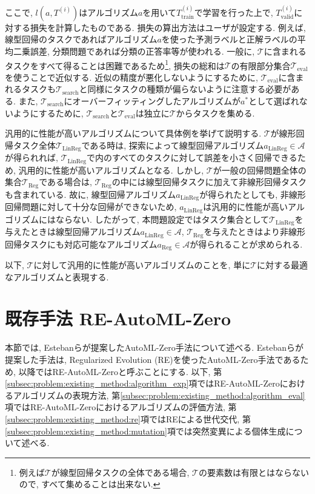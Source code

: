 \documentclass[11pt,oneside,openany,report]{jsbook}
\begin{document}
\noindent
ここで, $l(a, T^{(i)})$はアルゴリズム$a$を用いて$T^{(i)}_\mathrm{train}$で学習を行った上で, $T^{(i)}_\mathrm{valid}$に対する損失を計算したものである. 損失の算出方法はユーザが設定する. 例えば, 線型回帰のタスクであればアルゴリズム$a$を使った予測ラベルと正解ラベルの平均二乗誤差, 分類問題であれば分類の正答率等が使われる. 一般に, $\mathcal{T}$に含まれるタスクをすべて得ることは困難であるため\footnote{例えば$\mathcal{T}$が線型回帰タスクの全体である場合, $\mathcal{T}$の要素数は有限とはならないので, すべて集めることは出来ない. }, 損失の総和は$\mathcal{T}$の有限部分集合$\mathcal{T}_\mathrm{eval}$を使うことで近似する. 近似の精度が悪化しないようにするために, $\mathcal{T}_\mathrm{eval}$に含まれるタスクも$\mathcal{T}_\mathrm{search}$と同様にタスクの種類が偏らないように注意する必要がある. また, $\mathcal{T}_\mathrm{search}$にオーバーフィッティングしたアルゴリズムが$a^\ast$として選ばれないようにするために, $\mathcal{T}_\mathrm{search}$と$\mathcal{T}_\mathrm{eval}$は独立に$\mathcal{T}$からタスクを集める.

汎用的に性能が高いアルゴリズムについて具体例を挙げて説明する. $\mathcal{T}$が線形回帰タスク全体$\mathcal{T}_\mathrm{LinReg}$である時は, 探索によって線型回帰アルゴリズム$a_\mathrm{LinReg} \in \mathcal{A}$が得られれば, $\mathcal{T}_\mathrm{LinReg}$で内のすべてのタスクに対して誤差を小さく回帰できるため, 汎用的に性能が高いアルゴリズムとなる. しかし, $\mathcal{T}$が一般の回帰問題全体の集合$\mathcal{T}_\mathrm{Reg}$である場合は, $\mathcal{T}_\mathrm{Reg}$の中には線型回帰タスクに加えて非線形回帰タスクも含まれている. 故に, 線型回帰アルゴリズム$a_\mathrm{LinReg}$が得られたとしても, 非線形回帰問題に対して十分な回帰ができないため, $a_\mathrm{LinReg}$は汎用的に性能が高いアルゴリズムにはならない. したがって, 本問題設定ではタスク集合として$\mathcal{T}_\mathrm{LinReg}$を与えたときは線型回帰アルゴリズム$a_\mathrm{LinReg}\in \mathcal{A}$, $\mathcal{T}_\mathrm{Reg}$を与えたときはより非線形回帰タスクにも対応可能なアルゴリズム$a_\mathrm{Reg}\in \mathcal{A}$が得られることが求められる.

以下, $\mathcal{T}$に対して汎用的に性能が高いアルゴリズムのことを, 単に$\mathcal{T}$に対する最適なアルゴリズムと表現する.

\section{既存手法 RE-AutoML-Zero}\label{sec:problem:re_automl_zero}

本節では, Estebanらが提案したAutoML-Zero手法について述べる. Estebanらが提案した手法は, Regularized Evolution (RE)を使ったAutoML-Zero手法であるため, 以降ではRE-AutoML-Zeroと呼ぶことにする. 以下, 第\ref{subsec:problem:existing_method:algorithm_exp}項ではRE-AutoML-Zeroにおけるアルゴリズムの表現方法, 第\ref{subsec:problem:existing_method:algorithm_eval}項ではRE-AutoML-Zeroにおけるアルゴリズムの評価方法, 第\ref{subsec:problem:existing_method:re}項ではREによる世代交代, 第\ref{subsec:problem:existing_method:mutation}項では突然変異による個体生成について述べる.
\end{document}
